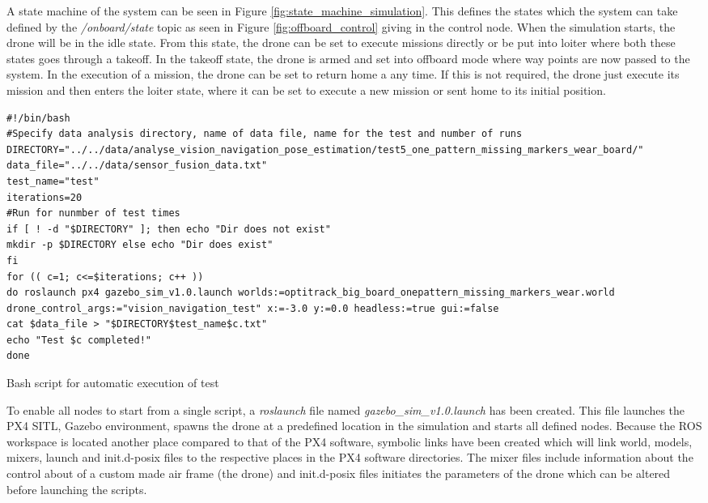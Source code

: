 \documentclass[../Head/report.tex]{subfiles}
\begin{document}
A state machine of the system can be seen in Figure \ref{fig:state_machine_simulation}. This defines the states which the system can take defined by the \textit{/onboard/state} topic as seen in Figure \ref{fig:offboard_control} giving in the control node. When the simulation starts, the drone will be in the idle state. From this state, the drone can be set to execute missions directly or be put into loiter where both these states goes through a takeoff. In the takeoff state, the drone is armed and set into offboard mode where way points are now passed to the system. In the execution of a mission, the drone can be set to return home a any time. If this is not required, the drone just execute its mission and then enters the loiter state, where it can be set to execute a new mission or sent home to its initial position.  


\begin{listing}[H] 
\begin{tcolorbox}[
    enhanced,
    attach boxed title to top left={xshift=6mm,yshift=-3mm},
    colback=lightgreen!20,
    colframe=lightgreen,
    fonttitle=\bfseries\color{black},
]
\begin{verbatim}
#!/bin/bash
#Specify data analysis directory, name of data file, name for the test and number of runs
DIRECTORY="../../data/analyse_vision_navigation_pose_estimation/test5_one_pattern_missing_markers_wear_board/"
data_file="../../data/sensor_fusion_data.txt"
test_name="test"
iterations=20
#Run for nunmber of test times 
if [ ! -d "$DIRECTORY" ]; then echo "Dir does not exist" 
mkdir -p $DIRECTORY else echo "Dir does exist"
fi
for (( c=1; c<=$iterations; c++ ))
do roslaunch px4 gazebo_sim_v1.0.launch worlds:=optitrack_big_board_onepattern_missing_markers_wear.world drone_control_args:="vision_navigation_test" x:=-3.0 y:=0.0 headless:=true gui:=false 
cat $data_file > "$DIRECTORY$test_name$c.txt" 
echo "Test $c completed!"
done

\end{verbatim}
\end{tcolorbox}
\caption{Bash script for automatic execution of test}
\label{lst:bash_script_for_automatic_execution_of_test}    
\end{listing}   


To enable all nodes to start from a single script, a \textit{roslaunch} file named \textit{gazebo\_sim\_v1.0.launch} has been created. This file launches the PX4 SITL, Gazebo environment, spawns the drone at a predefined location in the simulation and starts all defined nodes. Because the ROS workspace is located another place compared to that of the PX4 software, symbolic links have been created which will link world, models, mixers, launch and init.d-posix files to the respective places in the PX4 software directories. The mixer files include information about the control about of a custom made air frame (the drone) and init.d-posix files initiates the parameters of the drone which can be altered before launching the scripts.  
\end{document}
